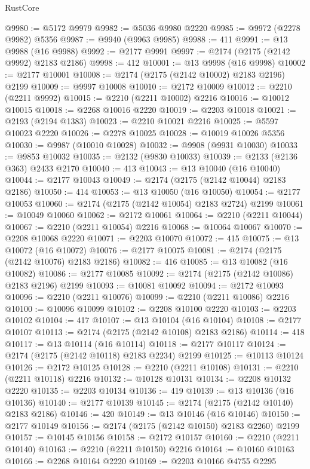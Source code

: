 \begin{lexlean}{RustCore}
\begin{coremodule}
@9980 := @5172 @9979
@9982 := @5036 @9980 @2220
@9985 := @9972 (@2278 @9982) @5356
@9987 := @9940 (@9963 @9985)
@9988 := 411
@9991 := @13 @9988 (@16 @9988)
@9992 := @2177 @9991
@9997 := @2174 (@2175 (@2142 @9992) @2183 @2186)
@9998 := 412
@10001 := @13 @9998 (@16 @9998)
@10002 := @2177 @10001
@10008 := @2174 (@2175 (@2142 @10002) @2183 @2196) @2199
@10009 := @9997 @10008
@10010 := @2172 @10009
@10012 := @2210 (@2211 @9992)
@10015 := @2210 (@2211 @10002) @2216
@10016 := @10012 @10015
@10018 := @2268 @10016 @2220
@10019 := @2203 @10018
@10021 := @2193 (@2194 @1383)
@10023 := @2210 @10021 @2216
@10025 := @5597 @10023 @2220
@10026 := @2278 @10025
@10028 := @10019 @10026 @5356
@10030 := @9987 (@10010 @10028)
@10032 := @9908 (@9931 @10030)
@10033 := @9853 @10032
@10035 := @2132 (@9830 @10033)
@10039 := @2133 (@2136 @363) @2433 @2170
@10040 := 413
@10043 := @13 @10040 (@16 @10040)
@10044 := @2177 @10043
@10049 := @2174 (@2175 (@2142 @10044) @2183 @2186)
@10050 := 414
@10053 := @13 @10050 (@16 @10050)
@10054 := @2177 @10053
@10060 := @2174 (@2175 (@2142 @10054) @2183 @2724) @2199
@10061 := @10049 @10060
@10062 := @2172 @10061
@10064 := @2210 (@2211 @10044)
@10067 := @2210 (@2211 @10054) @2216
@10068 := @10064 @10067
@10070 := @2208 @10068 @2220
@10071 := @2203 @10070
@10072 := 415
@10075 := @13 @10072 (@16 @10072)
@10076 := @2177 @10075
@10081 := @2174 (@2175 (@2142 @10076) @2183 @2186)
@10082 := 416
@10085 := @13 @10082 (@16 @10082)
@10086 := @2177 @10085
@10092 := @2174 (@2175 (@2142 @10086) @2183 @2196) @2199
@10093 := @10081 @10092
@10094 := @2172 @10093
@10096 := @2210 (@2211 @10076)
@10099 := @2210 (@2211 @10086) @2216
@10100 := @10096 @10099
@10102 := @2208 @10100 @2220
@10103 := @2203 @10102
@10104 := 417
@10107 := @13 @10104 (@16 @10104)
@10108 := @2177 @10107
@10113 := @2174 (@2175 (@2142 @10108) @2183 @2186)
@10114 := 418
@10117 := @13 @10114 (@16 @10114)
@10118 := @2177 @10117
@10124 := @2174 (@2175 (@2142 @10118) @2183 @2234) @2199
@10125 := @10113 @10124
@10126 := @2172 @10125
@10128 := @2210 (@2211 @10108)
@10131 := @2210 (@2211 @10118) @2216
@10132 := @10128 @10131
@10134 := @2208 @10132 @2220
@10135 := @2203 @10134
@10136 := 419
@10139 := @13 @10136 (@16 @10136)
@10140 := @2177 @10139
@10145 := @2174 (@2175 (@2142 @10140) @2183 @2186)
@10146 := 420
@10149 := @13 @10146 (@16 @10146)
@10150 := @2177 @10149
@10156 := @2174 (@2175 (@2142 @10150) @2183 @2260) @2199
@10157 := @10145 @10156
@10158 := @2172 @10157
@10160 := @2210 (@2211 @10140)
@10163 := @2210 (@2211 @10150) @2216
@10164 := @10160 @10163
@10166 := @2268 @10164 @2220
@10169 := @2203 @10166 @4755 @2295

\end{coremodule}
\end{lexlean}
